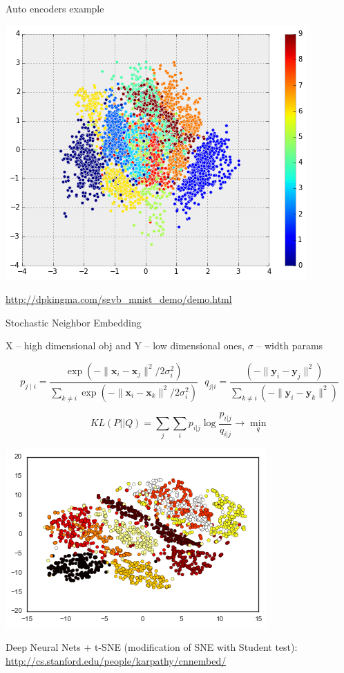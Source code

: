 \documentclass{beamer}
\begin{document}
\begin{frame}{Auto encoders example}
		 \begin{center}
		 	\includegraphics[scale=0.4]{img/autoenc}
		 \end{center}
	
	\href{http://dpkingma.com/sgvb_mnist_demo/demo.html}{http://dpkingma.com/sgvb\_mnist\_demo/demo.html}
\end{frame}

\begin{frame}{Stochastic Neighbor Embedding}
	
	X -- high dimensional obj and Y -- low dimensional ones, $\sigma$ -- width params
	
	$$p_{j\mid i} = \frac{\exp(-\lVert\mathbf{x}_i - \mathbf{x}_j\rVert^2 / 2\sigma_i^2)}{\sum_{k \neq i} \exp(-\lVert\mathbf{x}_i - \mathbf{x}_k\rVert^2 / 2\sigma_i^2)}~~~q_{j|i} = \frac{(-\lVert \mathbf{y}_i - \mathbf{y}_j\rVert^2)}{\sum_{k \neq i} (-\lVert \mathbf{y}_i - \mathbf{y}_k\rVert^2)}$$
	
	$$KL(P||Q) = \sum_j\sum_{i} p_{i|j} \log \frac{p_{i|j}}{q_{i|j}} \rightarrow \min_q$$
	
	 \begin{center}
		 	\includegraphics[scale=0.4]{img/tsne_mnist}
	 \end{center}
	
	Deep Neural Nets + t-SNE (modification of SNE with Student test): \href{http://cs.stanford.edu/people/karpathy/cnnembed/}{http://cs.stanford.edu/people/karpathy/cnnembed/}
\end{frame}
\end{document}
